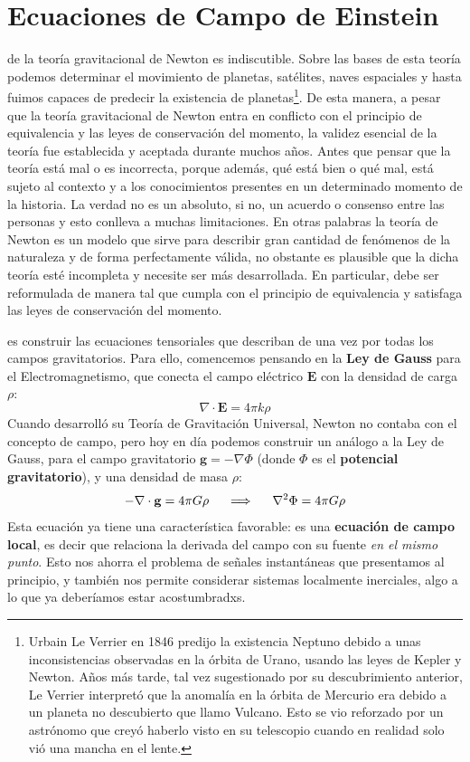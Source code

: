 \chapter{\textcolor{myred}{Ecuaciones de Campo de Einstein}}

 de la teoría gravitacional de Newton es indiscutible. Sobre las bases de esta teoría podemos determinar el movimiento de planetas, satélites, naves espaciales y hasta fuimos capaces de predecir la existencia de planetas\footnote{Urbain Le Verrier en 1846 predijo la existencia Neptuno debido a unas inconsistencias observadas en la órbita de Urano, usando las leyes de Kepler y Newton. Años más tarde, tal vez sugestionado por su descubrimiento anterior, Le Verrier interpretó que la anomalía en la órbita de Mercurio era debido a un planeta no descubierto que llamo Vulcano. Esto se vio reforzado por un astrónomo que creyó haberlo visto en su telescopio cuando en realidad solo vió una mancha en el lente.}.
De esta manera, a pesar que la teoría gravitacional de Newton entra en conflicto con el principio de equivalencia y las leyes de conservación del momento, la validez esencial de la teoría fue establecida y aceptada durante muchos años. Antes que pensar que la teoría está mal o es incorrecta, porque además, qué está bien o qué mal, está sujeto al contexto y a los conocimientos presentes en un determinado momento de la historia. La verdad no es un absoluto, si no, un acuerdo o consenso entre las personas y esto conlleva a muchas limitaciones. En otras palabras la teoría de Newton es un modelo que sirve para describir gran cantidad de fenómenos de la naturaleza y de forma perfectamente válida, no obstante es plausible que la dicha teoría esté incompleta y necesite ser más desarrollada. En particular, debe ser reformulada de manera tal que cumpla con el principio de equivalencia y satisfaga las leyes de conservación del momento.

 es construir las ecuaciones tensoriales que describan de una vez por todas los campos gravitatorios. Para ello, comencemos pensando en la \textbf{Ley de Gauss} para el Electromagnetismo, que conecta el campo eléctrico $\mathbf{E}$ con la densidad de carga $\rho$:
    $$\nabla \cdot \mathbf{E}= 4\pi k \rho$$
Cuando desarrolló su Teoría de Gravitación Universal, Newton no contaba con el concepto de campo, pero hoy en día podemos construir un análogo a la Ley de Gauss, para el campo gravitatorio $\mathbf{g}=-\nabla \Phi$ (donde $\Phi$ es el \textbf{potencial gravitatorio}), y una densidad de masa $\rho$:
    $$-\nabla \cdot \mathbf{g}= 4\pi G \rho \hspace{0.5cm}\Longrightarrow\hspace{0.5cm} \nabla^2\Phi=4\pi G\rho$$
Esta ecuación ya tiene una característica favorable: es una \textbf{ecuación de campo local}, es decir que relaciona la derivada del campo con su fuente \textit{en el mismo punto}. Esto nos ahorra el problema de señales instantáneas que presentamos al principio, y también nos permite considerar sistemas localmente inerciales, algo a lo que ya deberíamos estar acostumbradxs. 

